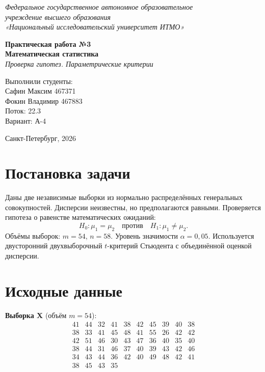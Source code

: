 \documentclass[a4paper,12pt]{article}
\begin{document}
\begin{center}

    {\normalsize \textit{ Федеральное государственное автономное образовательное }\\}
    {\normalsize \textit{учреждение высшего образования}\\}
    {\normalsize \textit{ «Национальный исследовательский университет ИТМО»}}

    \vspace*{4cm}

    {\Large \textbf{Практическая работа №3}}\\[0.3cm]
    {\large \textbf{Математическая статистика}}\\[1cm]

    \textit{Проверка гипотез. Параметрические критерии\\[3cm]}

    {\large
    Выполнили студенты: \\[0.1cm]
    Сафин Максим 467371 \\[0.1cm]
    Фокин Владимир 467883 \\[0.8cm]
    Поток: 22.3\\[0.8cm]
    Вариант: А-4
    }

    \vfill

    {\normalsize Санкт-Петербург, 2026}

\end{center}
\thispagestyle{empty}
\newpage

\section*{Постановка задачи}
Даны две независимые выборки из нормально распределённых генеральных совокупностей. Дисперсии неизвестны, но предполагаются равными. Проверяется гипотеза о равенстве математических ожиданий:
\[
H_0 : \mu_1 = \mu_2 \quad \text{против} \quad H_1 : \mu_1 \neq \mu_2.
\]
Объёмы выборок: $m = 54$, $n = 58$. Уровень значимости $\alpha = 0,05$. Используется двусторонний двухвыборочный $t$-критерий Стьюдента с объединённой оценкой дисперсии.

\section*{Исходные данные}
\textbf{Выборка X} (объём $m = 54$):
\[
\begin{array}{cccccccccc}
41 & 44 & 32 & 41 & 38 & 42 & 45 & 39 & 40 & 38 \\
38 & 33 & 41 & 45 & 48 & 41 & 55 & 26 & 42 & 42 \\
42 & 51 & 46 & 30 & 43 & 47 & 36 & 40 & 35 & 40 \\
38 & 44 & 31 & 46 & 37 & 40 & 39 & 43 & 42 & 46 \\
34 & 43 & 44 & 36 & 42 & 40 & 49 & 48 & 42 & 41 \\
38 & 45 & 43 & 35
\end{array}
\]
\end{document}
